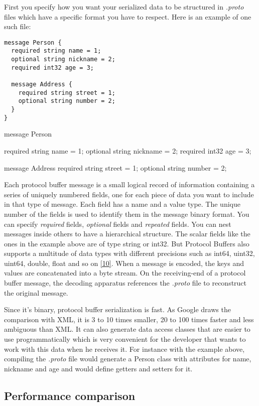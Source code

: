 \documentclass[12pt]{article}
\begin{document}
First you specify how you want your serialized data to be structured in \emph{.proto} files which have a specific format you have to respect. Here is an example of one such file: 

\begin{lstlisting}
message Person {
  required string name = 1;
  optional string nickname = 2;
  required int32 age = 3;

  message Address {
    required string street = 1;
    optional string number = 2;
  }
}
\end{lstlisting}

message Person {
  required string name = 1;
  optional string nickname = 2;
  required int32 age = 3;

  message Address {
    required string street = 1;
    optional string number = 2;
  }
}

Each protocol buffer message is a small logical record of information containing a series of uniquely numbered fields, one for each piece of data you want to include in that type of message. Each field has a name and a value type. The unique number of the fields is used to identify them in the message binary format. You can specify \emph{required} fields, \emph{optional} fields and \emph{repeated} fields. You can nest messages inside others to have a hierarchical structure. The scalar fields like the ones in the example above are of type string or int32. But Protocol Buffers also supports a multitude of data types with different precisions such as int64, uint32, uint64, double, float and so on \href{https://developers.google.com/protocol-buffers/docs/proto#scalar}{[10]}. When a message is encoded, the keys and values are concatenated into a byte stream. On the receiving-end of a protocol buffer message, the decoding apparatus references the \emph{.proto} file to reconstruct the original message. 

Since it’s binary, protocol buffer serialization is fast. As Google draws the comparison with XML, it is 3 to 10 times smaller, 20 to 100 times faster and less ambiguous than XML. It can also generate data access classes that are easier to use programmatically which is very convenient for the developer that wants to work with this data when he receives it. For instance with the example above, compiling the \emph{.proto} file would generate a Person class with attributes for name, nickname and age and would define getters and setters for it.

\subsection{Performance comparison}
\end{document}
